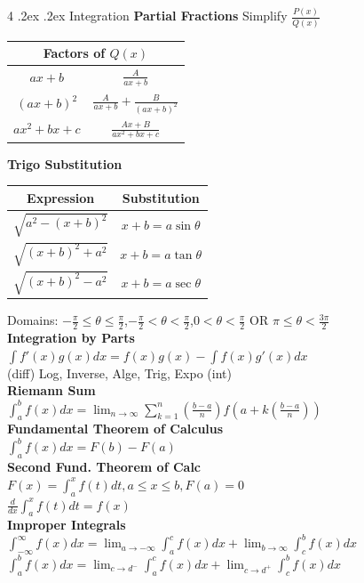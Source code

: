 \documentclass[10pt,landscape,a4paper]{article}
\makeatletter
\renewcommand{\section}{\@startsection{section}{1}{0mm}%
                                {.2ex}%
                                {.2ex}%
                                {\color{myblue}\sffamily\small\bfseries}}
\makeatother
\begin{document}
\begin{multicols*}{4}
\section{Integration}
\textbf{Partial Fractions}
Simplify $\frac{P(x)}{Q(x)}$
\begin{center}
   \begin{tabular}{|c|c|}
      \hline
      \multicolumn{2}{|c|}{Factors of $Q(x)$}\\
      \hline
      $ax+b$ & $\frac{A}{ax+b}$\\
      $(ax+b)^2$ & $\frac{A}{ax+b}+\frac{B}{(ax+b)^2}$\\
      $ax^2+bx+c$ & $\frac{Ax+B}{ax^2+bx+c}$\\
      \hline
   \end{tabular}
\end{center}
\textbf{Trigo Substitution}
\begin{center}
   \begin{tabular}{|c|c|}
      \hline
      Expression & Substitution\\
      \hline
      $\sqrt{a^2-(x+b)^2}$ & $x+b=a\sin\theta$\\
      $\sqrt{(x+b)^2+a^2}$ & $x+b=a\tan\theta$\\
      $\sqrt{(x+b)^2-a^2}$ & $x+b=a\sec\theta$\\
      \hline
   \end{tabular}
\end{center}
Domains: $-\frac{\pi}{2}\le\theta\le\frac{\pi}{2}$,$-\frac{\pi}{2}<\theta<\frac{\pi}{2}$,$0<\theta<\frac{\pi}{2}$ OR $\pi\le\theta<\frac{3\pi}{2}$\\
\textbf{Integration by Parts}\\
$\int f'(x)g(x)dx=f(x)g(x)-\int f(x)g'(x)dx$\\
(diff) Log, Inverse, Alge, Trig, Expo (int)\\
\textbf{Riemann Sum}\\
$\int_{a}^{b}f(x)dx=\lim_{n\to\infty}{\sum_{k=1}^{n}(\frac{b-a}{n})f(a+k(\frac{b-a}{n}))}$\\
\textbf{Fundamental Theorem of Calculus}\\
$\int_{a}^{b}f(x)dx=F(b)-F(a)$\\
\textbf{Second Fund. Theorem of Calc}\\
$F(x)=\int_{a}^{x}f(t)dt,a\le x\le b,F(a)=0$\\
$\frac{d}{dx}\int_{a}^{x}f(t)dt=f(x)$\\
\textbf{Improper Integrals}\\
$\int_{-\infty}^{\infty}f(x)dx=\lim_{a\to -\infty}\int_{a}^{c}f(x)dx+\lim_{b\to\infty}\int_{c}^{b}f(x)dx$\\
$\int_{a}^{b}f(x)dx=\lim_{c\to d^-}\int_{a}^{c}f(x)dx+\lim_{c\to d^+}\int_{c}^{b}f(x)dx$

\end{multicols*}
\end{document}
